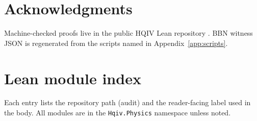 \documentclass[11pt]{amsart}
\begin{document}
\section*{Acknowledgments}

Machine-checked proofs live in the public HQIV Lean repository
\cite{hqiv-lean}. BBN witness JSON is regenerated from the scripts named in
Appendix~\ref{app:scripts}.

\appendix

\section{Lean module index}
\label{app:lean-index}

Each entry lists the repository path (audit) and the reader-facing label used
in the body. All modules are in the \texttt{Hqiv.Physics} namespace unless
noted.
\end{document}
